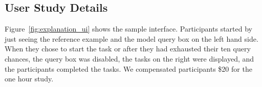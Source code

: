 \subsection{User Study Details}
\label{appendix:exp_user_study}

Figure~\ref{fig:explanation_ui} shows the sample interface. 
Participants started by just seeing the reference example and the model query box on the left hand side.
When they chose to start the task or after they had exhausted their ten query chances, the query box was disabled, the tasks on the right were displayed, and the participants completed the tasks.
We compensated participants \$20 for the one hour study.

